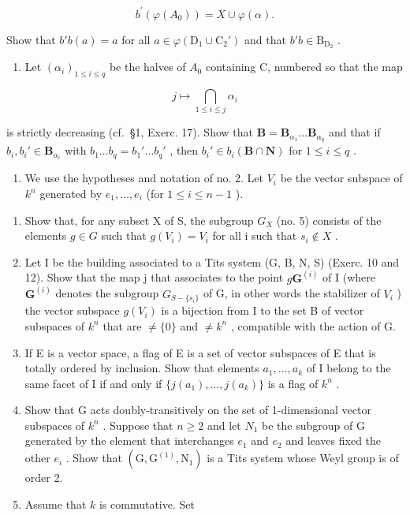 \[
b ^ {\prime} (\varphi (A _ {0})) = X \cup \varphi (\alpha).
\]

Show that \(b'b(a) = a\) for all \(a \in \varphi(\mathrm{D}_1 \cup \mathrm{C}_2')\) and that \(b'b \in \mathrm{B}_{\mathrm{D}_2}\) .

\begin{enumerate}
\def\labelenumi{\alph{enumi})}
\setcounter{enumi}{2}
\tightlist
\item
  Let \((\alpha_{i})_{1\leqslant i\leqslant q}\) be the halves of \(A_0\) containing C, numbered so that the map
\end{enumerate}

\[
j \mapsto \bigcap_ {1 \leqslant i \leqslant j} \alpha_ {i}
\]

is strictly decreasing (cf.~§1, Exerc. 17). Show that \(\mathbf{B} = \mathbf{B}_{\alpha_1} \ldots \mathbf{B}_{\alpha_q}\) and that if \(b_i, b_i' \in \mathbf{B}_{\alpha_i}\) with \(b_1 \ldots b_q = b_1' \ldots b_q'\) , then \(b_i' \in b_i(\mathbf{B} \cap \mathbf{N})\) for \(1 \leqslant i \leqslant q\) .

\begin{enumerate}
\def\labelenumi{(\arabic{enumi})}
\setcounter{enumi}{17}
\tightlist
\item
  We use the hypotheses and notation of no. 2. Let \(V_i\) be the vector subspace of \(k^n\) generated by \(e_1, \ldots, e_i\) (for \(1 \leqslant i \leqslant n - 1\) ).
\end{enumerate}

\begin{enumerate}
\def\labelenumi{\alph{enumi})}
\item
  Show that, for any subset X of S, the subgroup \(G_{X}\) (no. 5) consists of the elements \(g \in G\) such that \(g(V_{i}) = V_{i}\) for all i such that \(s_{i} \notin X\) .
\item
  Let I be the building associated to a Tits system (G, B, N, S) (Exerc. 10 and 12). Show that the map j that associates to the point \(g\mathbf{G}^{(i)}\) of I (where \(\mathbf{G}^{(i)}\) denotes the subgroup \(G_{S-\{s_i\}}\) of G, in other words the stabilizer of \(V_i\) ) the vector subspace \(g(V_i)\) is a bijection from I to the set B of vector subspaces of \(k^n\) that are \(\neq \{0\}\) and \(\neq k^n\) , compatible with the action of G.
\item
  If E is a vector space, a flag of E is a set of vector subspaces of E that is totally ordered by inclusion. Show that elements \(a_{1}, \ldots, a_{k}\) of I belong to the same facet of I if and only if \(\{j(a_{1}), \ldots, j(a_{k})\}\) is a flag of \(k^{n}\) .
\item
  Show that G acts doubly-transitively on the set of 1-dimensional vector subspaces of \(k^{n}\) . Suppose that \(n \geqslant 2\) and let \(N_{1}\) be the subgroup of G generated by the element that interchanges \(e_{1}\) and \(e_{2}\) and leaves fixed the other \(e_{i}\) . Show that \((\mathrm{G}, \mathrm{G}^{(1)}, \mathrm{N}_{1})\) is a Tits system whose Weyl group is of order 2.
\item
  Assume that \(k\) is commutative. Set
\end{enumerate}

